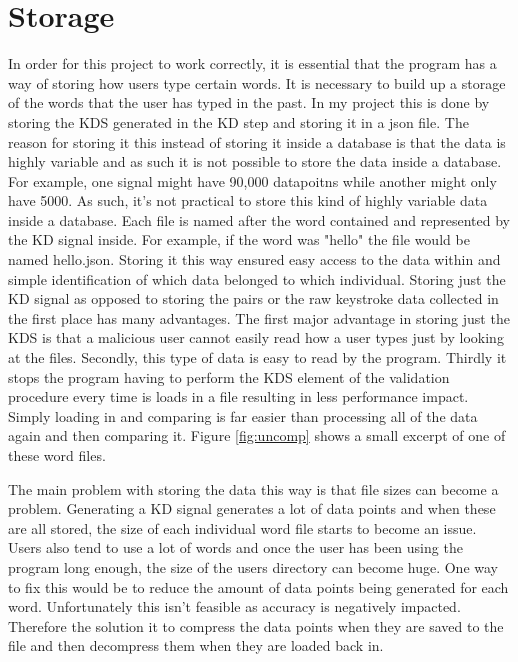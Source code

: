 \documentclass[10pt,a4paper]{report}
\begin{document}
\section{Storage}
\label{sssec:Storage}
In order for this project to work correctly, it is essential that the program has a way of storing how users type certain words. It is necessary to build up a storage of the words that the user has typed in the past. In my project this is done by storing the KDS generated in the KD step and storing it in a json file. The reason for storing it this instead of storing it inside a database is that the data is highly variable and as such it is not possible to store the data inside a database. For example, one signal might have 90,000 datapoitns while another might only have 5000. As such, it's not practical to store this kind of highly variable data inside a database. Each file is named after the word contained and represented by the KD signal inside. For example, if the word was "hello" the file would be named hello.json. Storing it this way ensured easy access to the data within and simple identification of which data belonged to which individual. Storing just the KD signal as opposed to storing the pairs or the raw keystroke data collected in the first place has many advantages. The first major advantage in storing just the KDS is that a malicious user cannot easily read how a user types just by looking at the files. Secondly, this type of data is easy to read by the program. Thirdly it stops the program having to perform the KDS element of the validation procedure every time is loads in a file resulting in less performance impact. Simply loading in and comparing is far easier than processing all of the data again and then comparing it. Figure \ref{fig:uncomp} shows a small excerpt of one of these word files.

The main problem with storing the data this way is that file sizes can become a problem. Generating a KD signal generates a lot of data points and when these are all stored, the size of each individual word file starts to become an issue. Users also tend to use a lot of words and once the user has been using the program long enough, the size of the users directory can become huge. One way to fix this would be to reduce the amount of data points being generated for each word. Unfortunately this isn't feasible as accuracy is negatively impacted. Therefore the solution it to compress the data points when they are saved to the file and then decompress them when they are loaded back in.
\end{document}
